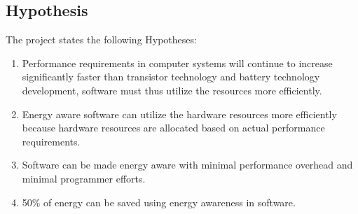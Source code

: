 \documentclass{article}
\begin{document}
% 


\subsection{Hypothesis}
The project states the following Hypotheses:

\begin{enumerate}
 \item Performance requirements in computer systems will continue to increase significantly faster than transistor technology and battery technology development, software must thus utilize the resources more efficiently. \vspace{-0.2cm}
 \item Energy aware software can utilize the hardware resources more efficiently because hardware resources are allocated based on actual performance requirements.\vspace{-0.2cm}
 \item Software can be made energy aware with minimal performance overhead and minimal programmer efforts.\vspace{-0.2cm}
 \item 50\% of energy can be saved using energy awareness in software.
\end{enumerate}
\end{document}
